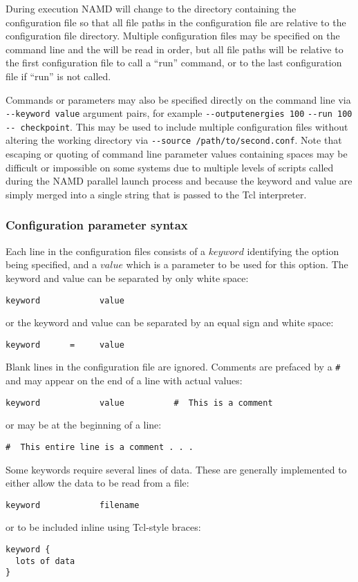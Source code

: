During execution NAMD will change to the directory containing the
configuration file so that all file paths in the configuration file
are relative to the configuration file directory.
Multiple configuration files may be specified on the command line
and the will be read in order, but all file paths will be relative
to the first configuration file to call a ``run'' command, or
to the last configuration file if ``run'' is not called.

Commands or parameters may also be specified directly on the
command line via \verb#--keyword value# argument pairs, for example
\verb#--outputenergies 100# \verb#--run 100# \verb#-- checkpoint#.
This may be used to include multiple configuration files without altering the
working directory via \verb#--source /path/to/second.conf#.
Note that escaping or quoting of command line parameter values
containing spaces may be difficult or impossible on some systems due
to multiple levels of scripts called during the NAMD parallel launch process
and because the keyword and value are simply merged into a single string
that is passed to the Tcl interpreter.

\subsubsection{Configuration parameter syntax}
\label{section:configsyntax}
Each line
in the configuration files consists of a $keyword$ identifying the option
being specified, and a $value$ which is a parameter to be used for this
option.  The keyword and value can be separated by only white space:
\begin{verbatim}
keyword            value
\end{verbatim}
or the keyword and value can be separated by an equal sign and white space:
\begin{verbatim}
keyword      =     value
\end{verbatim}
Blank lines in the configuration file are ignored.  Comments are prefaced by
a \verb!#! and may appear on the end of a line with actual values:
\begin{verbatim}
keyword            value          #  This is a comment
\end{verbatim}
or may be at the beginning of a line:
\begin{verbatim}
#  This entire line is a comment . . . 
\end{verbatim}
Some keywords require several lines of data.
These are generally implemented to either allow the data to be read from a file:
\begin{verbatim}
keyword            filename
\end{verbatim}
or to be included inline using Tcl-style braces:
\begin{verbatim}
keyword {
  lots of data
}
\end{verbatim}

